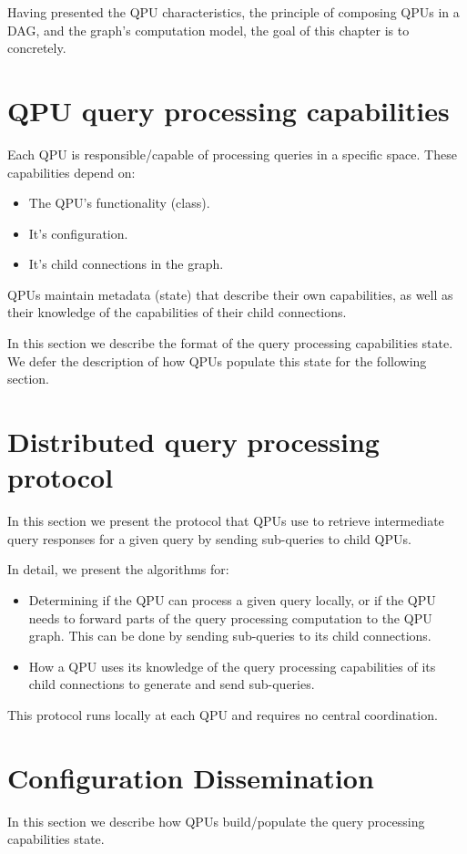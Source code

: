 Having presented the QPU characteristics, the principle of composing QPUs in a DAG, and the graph's computation model,
the goal of this chapter is to concretely.

\section{QPU query processing capabilities}

Each QPU is responsible/capable of processing queries in a specific space. These capabilities depend on:
\begin{itemize}
  \item The QPU's functionality (class).
  \item It's configuration.
  \item It's child connections in the graph.
\end{itemize}

QPUs maintain metadata (state) that describe their own capabilities, as well as their knowledge of the capabilities of
their child connections.

In this section we describe the format of the query processing capabilities state. We defer the description of how QPUs
populate this state for the following section.

\section{Distributed query processing protocol}
In this section we present the protocol that QPUs use to retrieve intermediate query responses for a given query by
sending sub-queries to child QPUs.

In detail, we present the algorithms for:
\begin{itemize}
  \item Determining if the QPU can process a given query locally, or if the QPU needs to forward parts of the query
  processing computation to the QPU graph.
  This can be done by sending sub-queries to its child connections.
  \item How a QPU uses its knowledge of the query processing capabilities of its child connections to generate and send
  sub-queries.
\end{itemize}

This protocol runs locally at each QPU and requires no central coordination.

\section{Configuration Dissemination}
In this section we describe how QPUs build/populate the query processing capabilities state.

